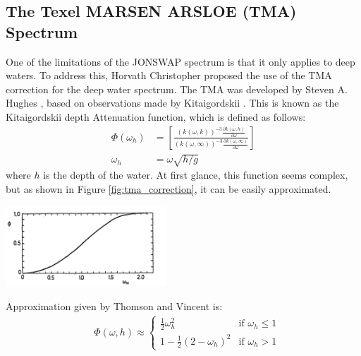 \subsection{The Texel MARSEN ARSLOE (TMA) Spectrum}
One of the limitations of the JONSWAP spectrum is that it only applies to deep waters. To address this, Horvath Christopher \cite{horvath2015} proposed the use of the TMA correction for the deep water spectrum. The TMA was developed by Steven A. Hughes \cite{hughes1984}, based on observations made by Kitaigordskii \cite{kitaigordskii1975}. This is known as the Kitaigordskii depth Attenuation function, which is defined as follows:
\begin{equation}
    \begin{aligned}
        \Phi(\omega_h) &= \left[ \frac{(k(\omega, k))^{-3}\frac{\partial k(\omega, h)}{\partial \omega}}{(k(\omega, \infty ))^{-3}\frac{\partial k(\omega, \infty)}{\partial \omega}} \right] \\
        \omega_h &= \omega \sqrt{h/g}
    \end{aligned}
\end{equation}
where $h$ is the depth of the water. At first glance, this function seems complex, but as shown in Figure \ref{fig:tma_correction}, it can be easily approximated.

\begin{minipage}{1\textwidth}
    \centering
    \includegraphics[width=0.45\textwidth]{"images/tma_correction.png"}
    \label{fig:tma_correction}
\end{minipage}

Approximation given by Thomson and Vincent \cite{thompson1983} is:
\begin{equation}
    \begin{aligned}
        &\Phi(\omega, h) \approx
        \begin{cases} 
        \frac{1}{2} \omega_h^{2} & \text{if } \omega_h \leq 1 \\
        1 - \frac{1}{2}(2 - \omega_h)^{2} & \text{if } \omega_h > 1
        \end{cases}
    \end{aligned}
\end{equation}

